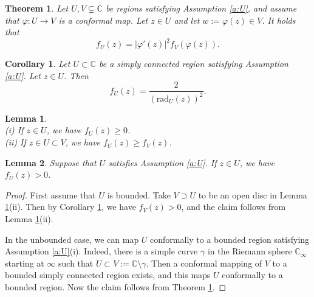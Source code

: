 \documentclass[10pt,a4paper]{amsart}
\newtheorem{theorem}{Theorem}
\newtheorem{corollary}{Corollary}
\newtheorem{lemma}{Lemma}
\newcommand{\eqnst}[1]{\begin{equation*}#1\end{equation*}}
\begin{document}
\begin{theorem}
\label{thm3_6}
    Let \(U, V \subsetneq \mathbb{C}\) be regions satisfying Assumption \ref{a:U}, and assume that
    $\varphi : U \to V$ is a conformal map. Let $z \in U$ and let $w := \varphi(z) \in V$. 
It holds that 
\eqnst{
 f_U(z)
 = |\varphi'(z)|^2 f_V(\varphi(z)). }
\end{theorem}

\begin{corollary}\label{cor3_7}
    Let \(U\subset\mathbb{C}\) be a simply connected region satisfying Assumption \ref{a:U}. Let \(z\in U\).  
Then 
    \[  f_U(z)
        = \frac{2}{(\mathrm{rad}_U(z))^2}.   \]
\end{corollary}

\begin{lemma}
\label{lem:monotone} \ \\
(i) If $z \in U$, we have $f_U(z) \ge 0$. \\
(ii) If $z \in U \subset V$, we have $f_U(z) \ge f_V(z)$.
\end{lemma}

\begin{lemma}
\label{lem:fU>0}
Suppose that $U$ satisfies Assumption \ref{a:U}. If $z \in U$, we have $f_U(z) > 0$.
\end{lemma}

\begin{proof}
First assume that $U$ is bounded.
Take $V \supset U$ to be an open disc in Lemma \ref{lem:monotone}(ii). Then by Corollary \ref{cor3_7}, 
we have $f_V(z) > 0$, and the claim follows from Lemma \ref{lem:monotone}(ii).

In the unbounded case, we can map $U$ conformally to a bounded region satisfying Assumption
\ref{a:U}(i). Indeed, there is a simple curve $\gamma$ in the Riemann sphere $\mathbb{C}_\infty$
starting at $\infty$ such that $U \subset V := \mathbb{C} \setminus \gamma$. Then a conformal
mapping of $V$ to a bounded simply connected region exists, and this maps $U$ conformally 
to a bounded region. Now the claim follows from Theorem \ref{thm3_6}.
\end{proof}
\end{document}
